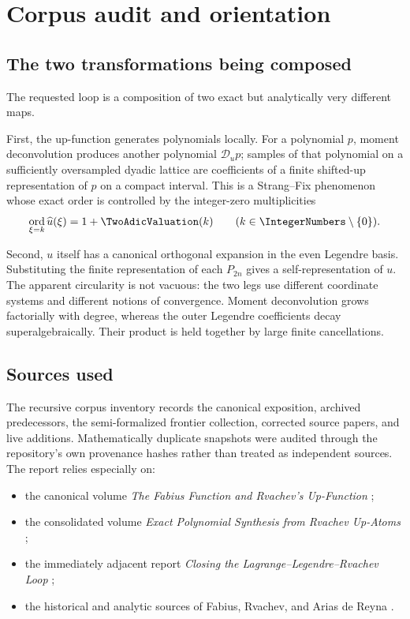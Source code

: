\documentclass[11pt,oneside]{article}
\numberwithin{equation}{section}
\theoremstyle{definition}
\theoremstyle{remark}
\newcommand{\Dscr}{\mathscr D_u}
\DeclareMathOperator{\ord}{ord}
\begin{document}
\clearpage
\tableofcontents
\clearpage

\section{Corpus audit and orientation}
\label{sec:audit}

\subsection{The two transformations being composed}

The requested loop is a composition of two exact but analytically very
different maps.

First, the up-function generates polynomials locally.  For a polynomial $p$,
moment deconvolution produces another polynomial $\Dscr p$; samples of that
polynomial on a sufficiently oversampled dyadic lattice are coefficients of a
finite shifted-up representation of $p$ on a compact interval.  This is a
Strang--Fix phenomenon whose exact order is controlled by the integer-zero
multiplicities
\[
 \ord_{\xi=k}\widehat u(\xi)=1+\TwoAdicValuation(k)
 \qquad(k\in\IntegerNumbers\setminus\{0\}).
\]

Second, $u$ itself has a canonical orthogonal expansion in the even Legendre
basis.  Substituting the finite representation of each $P_{2n}$ gives a
self-representation of $u$.  The apparent circularity is not vacuous: the two
legs use different coordinate systems and different notions of convergence.
Moment deconvolution grows factorially with degree, whereas the outer Legendre
coefficients decay superalgebraically.  Their product is held together by
large finite cancellations.

\subsection{Sources used}

The recursive corpus inventory records the canonical exposition, archived
predecessors, the semi-formalized frontier collection, corrected source papers,
and live additions.  Mathematically duplicate snapshots were audited through
the repository's own provenance hashes rather than treated as independent
sources.  The report relies especially on:
\begin{itemize}
  \item the canonical volume \emph{The Fabius Function and Rvachev's
  Up-Function} \cite{ProveItPrimary};
  \item the consolidated volume \emph{Exact Polynomial Synthesis from
  Rvachev Up-Atoms} \cite{ProveItPoly};
  \item the immediately adjacent report \emph{Closing the
  Lagrange--Legendre--Rvachev Loop} \cite{ProveItLagrange};
  \item the historical and analytic sources of Fabius, Rvachev, and Arias de
  Reyna \cite{Fabius1966,Rvachev1971,Rvachev1972,Rvachev1990,Arias1982,Arias2018}.
\end{itemize}
\end{document}

